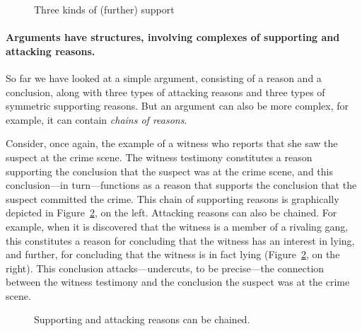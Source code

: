 \documentclass[10pt]{article}
\begin{document}
\begin{figure}[bt]
\centering

\caption{Three kinds of (further) support\label{fig:support}}
\end{figure}


\paragraph{Arguments have structures, involving complexes of supporting and attacking reasons.} 

So far we have looked at a simple argument,  consisting of a reason and a conclusion, along with three types 
of attacking reasons and three types of symmetric supporting reasons. But an argument can also be more complex, 
for example, it can contain \textit{chains of reasons}. 

Consider, once again, the example of a witness who reports that she saw the suspect at the crime scene. The witness testimony constitutes a 
reason supporting the conclusion that the suspect was at the crime scene, and this conclusion---in turn---functions as a reason 
that supports the conclusion that the suspect committed the crime. This chain of supporting reasons 
is graphically depicted in Figure~\ref{fig:arg2}, on the left. 
Attacking reasons can also be chained. For example, when it is discovered that the witness is a member of a rivaling gang, 
this constitutes a reason for concluding that the witness has an interest in lying, and further, for concluding 
that the witness is in fact lying (Figure~\ref{fig:arg2}, on the right). This conclusion attacks---undercuts, to be precise---the connection 
between the witness testimony and the conclusion the suspect was at the crime scene.

\begin{figure}[bt]
\centering

\caption{Supporting and attacking reasons can be chained. \label{fig:arg2}}
\end{figure}
\end{document}
